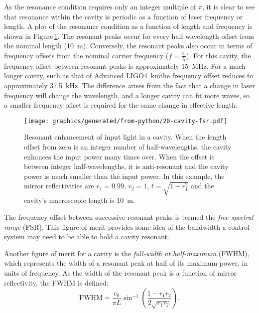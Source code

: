 As the resonance condition requires only an integer multiple of $\pi$, it is clear to see that resonance within the cavity is periodic as a function of laser frequency or length. A plot of the resonance condition as a function of length and frequency is shown in Figure\,\ref{fig:cavity-fsr}. The resonant peaks occur for every half wavelength offset from the nominal length (\SI{10}{\meter}). Conversely, the resonant peaks also occur in terms of frequency offsets from the nominal carrier frequency ($f = \frac{c_0}{\lambda}$). For this cavity, the frequency offset between resonant peaks is approximately \SI{15}{\mega\hertz}. For a much longer cavity, such as that of Advanced LIGO\textemdash \SI{4}{\kilo\meter}\textemdash the frequency offset reduces to approximately \SI{37.5}{\kilo\hertz}. The difference arises from the fact that a change in laser frequency will change the wavelength, and a longer cavity can fit more waves, so a smaller frequency offset is required for the same change in effective length.

\begin{figure}
  \centering
  \texttt{[image: graphics/generated/from-python/20-cavity-fsr.pdf]}
  \caption{\label{fig:cavity-fsr}Resonant enhancement of input light in a cavity. When the length offset from zero is an integer number of half-wavelengths, the cavity enhances the input power many times over. When the offset is between integer half-wavelengths, it is anti-resonant and the cavity power is much smaller than the input power. In this example, the mirror reflectivities are $r_1 = 0.99$, $r_2 = 1$, $t = \sqrt{1 - r_1^2}$ and the cavity's macroscopic length is \SI{10}{\meter}.}
\end{figure}

The frequency offset between successive resonant peaks is termed the \emph{free spectral range} (\gls{FSR}). This figure of merit provides some idea of the bandwidth a control system may need to be able to hold a cavity resonant.

Another figure of merit for a \FP{} cavity is the \emph{full-width at half-maximum} (\gls{FWHM}), which represents the width of a resonant peak at half of its maximum power, in units of frequency. As the width of the resonant peak is a function of mirror reflectivity, the \gls{FWHM} is defined:
\begin{equation}
  \text{FWHM} = \frac{c_0}{\pi L} \sin^{-1}{\left( \frac{1 - r_1 r_2}{2 \sqrt{r_1 r_2}} \right)}.
\end{equation}

